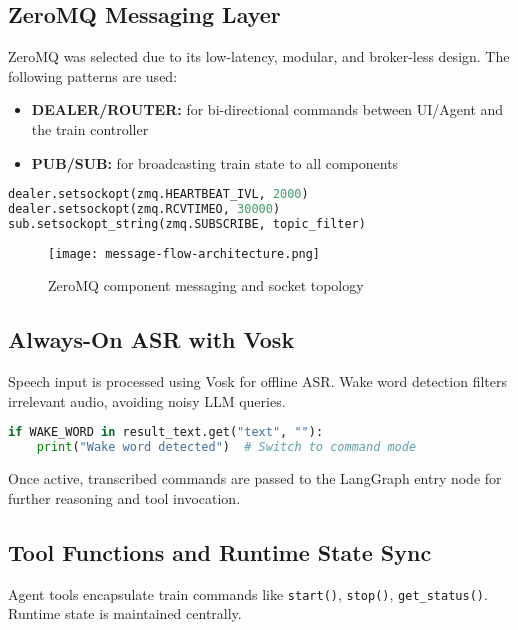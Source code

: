 \subsection{ZeroMQ Messaging Layer}

ZeroMQ was selected due to its low-latency, modular, and broker-less design. The following patterns are used:

\begin{itemize}
    \item \textbf{DEALER/ROUTER:} for bi-directional commands between UI/Agent and the train controller
    \item \textbf{PUB/SUB:} for broadcasting train state to all components
\end{itemize}

\begin{lstlisting}[language=Python, caption=Socket setup]
dealer.setsockopt(zmq.HEARTBEAT_IVL, 2000)
dealer.setsockopt(zmq.RCVTIMEO, 30000)
sub.setsockopt_string(zmq.SUBSCRIBE, topic_filter)
\end{lstlisting}

\begin{figure}[H]
    \centering
    \texttt{[image: message-flow-architecture.png]}
    \caption{ZeroMQ component messaging and socket topology}
\end{figure}

\subsection{Always-On ASR with Vosk}

Speech input is processed using Vosk for offline ASR. Wake word detection filters irrelevant audio, avoiding noisy LLM queries.

\begin{lstlisting}[language=Python, caption=Wake-word filtering]
if WAKE_WORD in result_text.get("text", ""):
    print("Wake word detected")  # Switch to command mode
\end{lstlisting}

Once active, transcribed commands are passed to the LangGraph entry node for further reasoning and tool invocation.

\subsection{Tool Functions and Runtime State Sync}

Agent tools encapsulate train commands like \texttt{start()}, \texttt{stop()}, \texttt{get\_status()}. Runtime state is maintained centrally.

